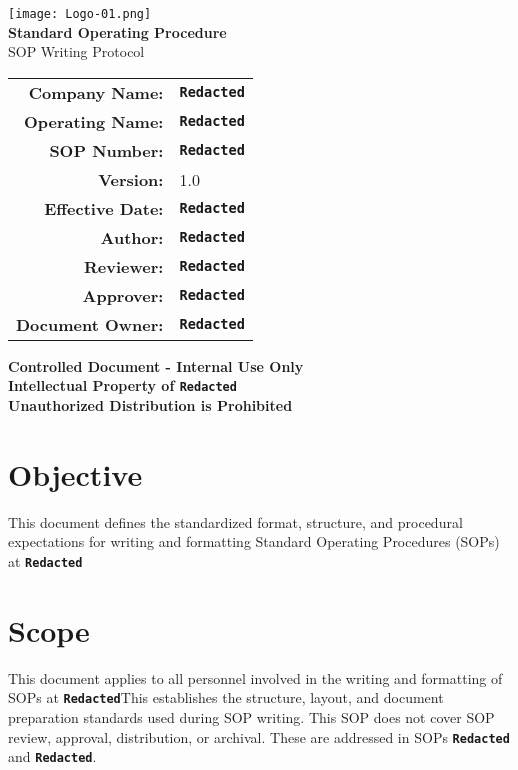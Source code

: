 \documentclass[11pt]{article}
\newcommand{\CompanyName}{\textbf{\texttt{Redacted}}}
\newcommand{\BrandName}{\textbf{\texttt{Redacted}}}
\newcommand{\DocumentID}{\textbf{\texttt{Redacted}}}
\newcommand{\EffectiveDate}{\textbf{\texttt{Redacted}}}
\newcommand{\Author}{\textbf{\texttt{Redacted}}}
\newcommand{\Reviewer}{\textbf{\texttt{Redacted}}}
\newcommand{\DocumentOwner}{\textbf{\texttt{Redacted}}}
\newcommand{\SOPTitle}{SOP Writing Protocol}
\newcommand{\CoverTitleFont}{\fontsize{22}{24}\selectfont\bfseries}
\newcommand{\CoverSubTitleFont}{\fontsize{18}{30}\selectfont}
\begin{document}
\thispagestyle{empty}
\begin{center}
    \texttt{[image: Logo-01.png]} \\
    \vspace{2cm}
    {\CoverTitleFont Standard Operating Procedure}\\ [0.25 cm]
    {\CoverSubTitleFont \SOPTitle}\\[0.25 cm]
    \vspace{2cm}
    \begin{center}
    \begin{tabular}{rl}
    \textbf{Company Name:} & \CompanyName\\
    \textbf{Operating Name:} & \BrandName \\
    \textbf{SOP Number:} & \DocumentID \\
    \textbf{Version:} & 1.0 \\
    \textbf{Effective Date:} & \EffectiveDate \\
    \textbf{Author:} & \Author \\
    \textbf{Reviewer:} & \Reviewer \\
    \textbf{Approver:} & \Author \\
    \textbf{Document Owner:} & \DocumentOwner \\
    \end{tabular}
    \end{center}
    \vspace{2cm}
    {\textbf{Controlled Document - Internal Use Only}}\\[0.1 cm]
    {\textbf{Intellectual Property of \CompanyName}}\\[0.1 cm]
    {\textbf{Unauthorized Distribution is Prohibited}}\\
\end{center}


\newpage
{}
\setcounter{page}{1}

\section{Objective}
    This document defines the standardized format, structure, and procedural expectations for writing and formatting Standard Operating Procedures (SOPs) at \CompanyName

\section{Scope}
    This document applies to all personnel involved in the writing and formatting of SOPs at \CompanyName \space This establishes the structure, layout, and document preparation standards used during SOP writing. This SOP does not cover SOP review, approval, distribution, or archival. These are addressed in SOPs {\textbf{\texttt{Redacted}}} and {\textbf{\texttt{Redacted}}}.
\end{document}
